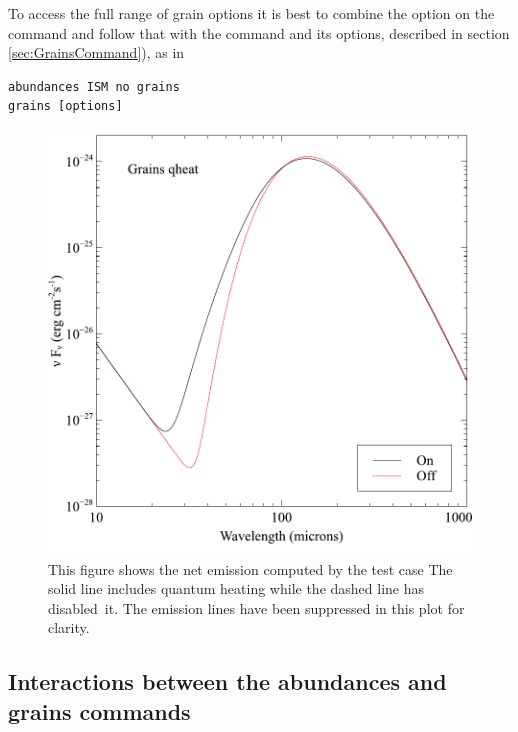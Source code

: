 To access the full range of grain options it is best to combine the 
option on the  command and follow that with
the  command and its options,
described in section \ref{sec:GrainsCommand}), as in
\begin{verbatim}
abundances ISM no grains
grains [options]
\end{verbatim}

\begin{figure}
\centering
\includegraphics{grains_qheat}
\caption[Quantum heating]{\label{fig:grains_qheat}This figure shows the
net emission computed by the test case
The solid line includes quantum heating while the dashed
line has disabled~it. The emission lines have been suppressed in this plot for clarity.}
\end{figure}

\subsection{Interactions between the abundances and grains commands}

